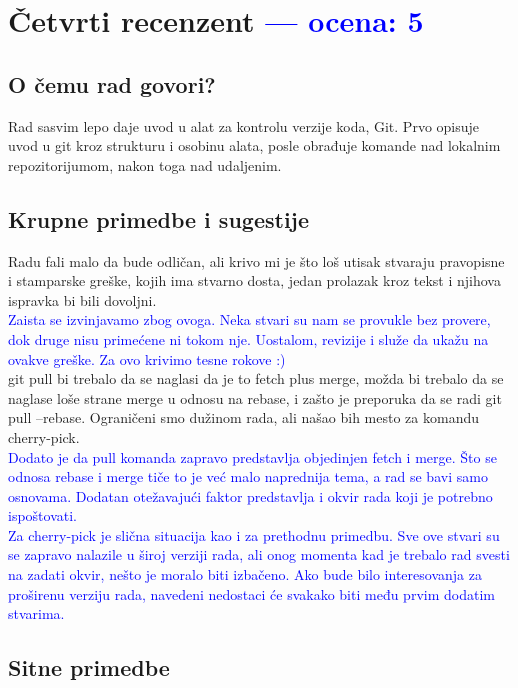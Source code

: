 \documentclass[a4paper]{report}
\newcommand{\odgovor}[1]{\textcolor{blue}{#1}}
\begin{document}
\chapter{Četvrti recenzent \odgovor{--- ocena: 5} }

\section{O čemu rad govori?}
Rad sasvim lepo daje uvod u alat za kontrolu verzije koda, Git. Prvo opisuje uvod u git kroz strukturu i osobinu alata, posle obrađuje komande nad lokalnim repozitorijumom, nakon toga nad udaljenim.
\section{Krupne primedbe i sugestije}
Radu fali malo da bude odličan, ali krivo mi je što loš utisak stvaraju pravopisne i stamparske greške, kojih ima stvarno dosta, jedan prolazak kroz tekst i njihova ispravka bi bili dovoljni.\\
\odgovor{Zaista se izvinjavamo zbog ovoga. Neka stvari su nam se provukle bez provere, dok druge nisu primećene ni tokom nje. Uostalom, revizije i služe da ukažu na ovakve greške. Za ovo krivimo tesne rokove :)\\ }
git pull bi trebalo da se naglasi da je to fetch plus merge, možda bi trebalo da se naglase loše strane merge u odnosu na rebase, i zašto je preporuka da se radi git pull --rebase. Ograničeni smo dužinom rada, ali našao bih mesto za komandu cherry-pick. \\
\odgovor{Dodato je da pull komanda zapravo predstavlja objedinjen fetch i merge. Što se odnosa rebase i merge tiče to je već malo naprednija tema, a rad se bavi samo osnovama. Dodatan otežavajući faktor predstavlja i okvir rada koji je potrebno ispoštovati.\\
Za cherry-pick je slična situacija kao i za prethodnu primedbu. Sve ove stvari su se zapravo nalazile u široj verziji rada, ali onog momenta kad je trebalo rad svesti na zadati okvir, nešto je moralo biti izbačeno. Ako bude bilo interesovanja za proširenu verziju rada, navedeni nedostaci će svakako biti među prvim dodatim stvarima.}
\section{Sitne primedbe}
\end{document}
